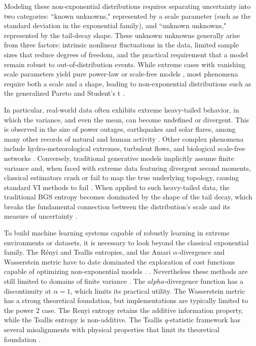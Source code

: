 \documentclass[twoside,11pt]{article}
\begin{document}
Modeling these non-exponential distributions requires separating uncertainty into two categories: ``known unknowns," represented by a scale parameter (such as the standard deviation in the exponential family), and ``unknown unknowns," represented by the tail-decay shape. These unknown unknowns generally arise from three factors: intrinsic nonlinear fluctuations in the data, limited sample sizes that reduce degrees of freedom, and the practical requirement that a model remain robust to out-of-distribution events. While extreme cases with vanishing scale parameters yield pure power-law \citep{clausetPowerLawDistributionsEmpirical2009} or scale-free models \citep{barabasiScaleFreeNetworksDecade2009}, most phenomena require both a scale and a shape, leading to non-exponential distributions such as the generalized Pareto \citep{arnoldParetoDistribution2015} and Student's t \citep{pearsonStudentsCollectedPapers1942}.

In particular, real-world data often exhibits extreme heavy-tailed behavior, in which the variance, and even the mean, can become undefined or divergent. This is observed in the size of power outages, earthquakes and solar flares, among many other records of natural and human activity \citep{clausetPowerLawDistributionsEmpirical2009}. Other complex phenomena include hydro-meteorological extremes, turbulent flows, and biological scale-free networks \citep{koutsoyiannisUncertaintyEntropyScaling2005, gisigerScaleInvarianceBiology2001}. Conversely, traditional generative models implicitly assume finite variance and, when faced with extreme data featuring divergent second moments, classical estimators crash or fail to map the true underlying topology, causing standard VI methods to fail \citep{gurbuzbalabanHeavyTailPhenomenonSGD2021}. When applied to such heavy-tailed data, the traditional BGS entropy becomes dominated by the shape of the tail decay, which breaks the fundamental connection between the distribution's scale and its measure of uncertainty \citep{nelsonUniqueUniversalEntropy2026}.

To build machine learning systems capable of robustly learning in extreme environments or datasets, it is necessary to look beyond the classical exponential family. The Rényi and Tsallis entropies, and the Amari $\alpha$-divergence and Wasserstein metric have to date dominated the exploration of cost functions capable of optimizing non-exponential models \citep{kobayashisQVAEDisentangledRepresentation2020,principeInformationTheoreticLearning2010,liRenyiDivergenceVariational2016,amariBackpropagationStochasticGradient1993, tolstikhinWassersteinAutoEncoders2018}.    . Nevertheless these methods are still limited to domains of finite variance \cite{caoCoupledVAEImproved2022}. The $alpha$-divergence function has a discontinuity at $\alpha=1$, which limits its practical utility. The Wasserstein metric has a strong theoretical foundation, but implementations are typically limited to the power 2 case. The Renyi entropy retains the additive information property, while the Tsallis entropy is non-additive. The Tsallis $q$-statistic framework has several misalignments with physical properties that limit its theoretical foundation \citep{nelsonOpenProblemsNonextensive2024}.
\end{document}
